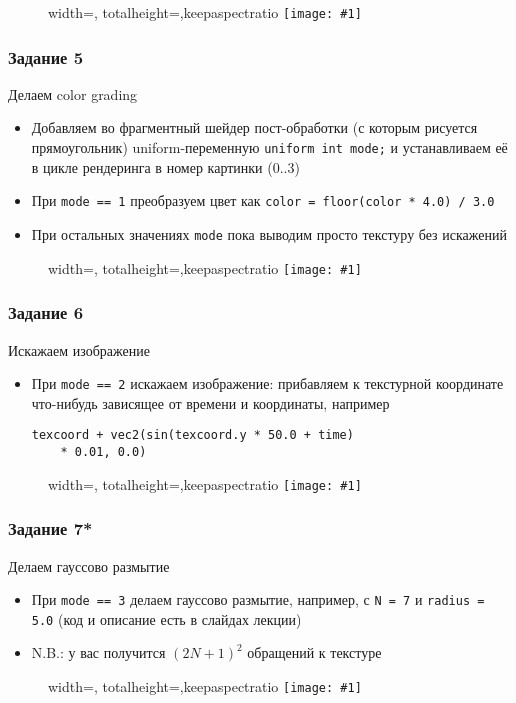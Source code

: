 \documentclass{beamer}
\newcommand{\slideimage}[1]{
  \begin{figure}
    \begin{adjustbox}{width=\textwidth, totalheight=\textheight-2\baselineskip-2\baselineskip,keepaspectratio}
      \texttt{[image: \#1]}
    \end{adjustbox}
  \end{figure}
}
\begin{document}
\begin{frame}[fragile]
\slideimage{4.png}
\end{frame}

\begin{frame}[fragile]
\frametitle{Задание 5}
Делаем color grading
\begin{itemize}
\item Добавляем во фрагментный шейдер пост-обработки (с которым рисуется прямоугольник) uniform-переменную \verb|uniform int mode;| и устанавливаем её в цикле рендеринга в номер картинки (0..3)
\item При \verb|mode == 1| преобразуем цвет как \verb|color = floor(color * 4.0) / 3.0|
\item При остальных значениях \verb|mode| пока выводим просто текстуру без искажений
\end{itemize}
\end{frame}

\begin{frame}[fragile]
\slideimage{5.png}
\end{frame}

\begin{frame}[fragile]
\frametitle{Задание 6}
Искажаем изображение
\begin{itemize}
\item При \verb|mode == 2| искажаем изображение: прибавляем к текстурной координате что-нибудь зависящее от времени и координаты, например 
\begin{verbatim}
texcoord + vec2(sin(texcoord.y * 50.0 + time)
    * 0.01, 0.0)
\end{verbatim}
\end{itemize}
\end{frame}

\begin{frame}[fragile]
\slideimage{6.png}
\end{frame}

\begin{frame}[fragile]
\frametitle{Задание 7*}
Делаем гауссово размытие
\begin{itemize}
\item При \verb|mode == 3| делаем гауссово размытие, например, с \verb|N = 7| и \verb|radius = 5.0| (код и описание есть в слайдах лекции)
\item N.B.: у вас получится \begin{math}(2N+1)^2\end{math} обращений к текстуре
\end{itemize}
\end{frame}

\begin{frame}[fragile]
\slideimage{7.png}
\end{frame}
\end{document}
